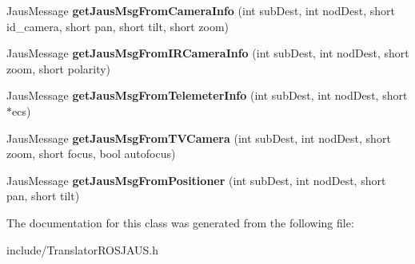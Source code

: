 \begin{DoxyCompactItemize}
\item 
\hypertarget{class_translator_r_o_s_j_a_u_s_a167106a825d6150694f072ceae6713d5}{\-Jaus\-Message {\bfseries get\-Jaus\-Msg\-From\-Camera\-Info} (int sub\-Dest, int nod\-Dest, short id\-\_\-camera, short pan, short tilt, short zoom)}\label{class_translator_r_o_s_j_a_u_s_a167106a825d6150694f072ceae6713d5}

\item 
\hypertarget{class_translator_r_o_s_j_a_u_s_aa5b8fd82be3d47ec039d7152cbe9ed62}{\-Jaus\-Message {\bfseries get\-Jaus\-Msg\-From\-I\-R\-Camera\-Info} (int sub\-Dest, int nod\-Dest, short zoom, short polarity)}\label{class_translator_r_o_s_j_a_u_s_aa5b8fd82be3d47ec039d7152cbe9ed62}

\item 
\hypertarget{class_translator_r_o_s_j_a_u_s_ad2fef431c697d2f4571d019e3d48c6f3}{\-Jaus\-Message {\bfseries get\-Jaus\-Msg\-From\-Telemeter\-Info} (int sub\-Dest, int nod\-Dest, short $\ast$ecs)}\label{class_translator_r_o_s_j_a_u_s_ad2fef431c697d2f4571d019e3d48c6f3}

\item 
\hypertarget{class_translator_r_o_s_j_a_u_s_ad41154d4df9127fff126923330e3cad8}{\-Jaus\-Message {\bfseries get\-Jaus\-Msg\-From\-T\-V\-Camera} (int sub\-Dest, int nod\-Dest, short zoom, short focus, bool autofocus)}\label{class_translator_r_o_s_j_a_u_s_ad41154d4df9127fff126923330e3cad8}

\item 
\hypertarget{class_translator_r_o_s_j_a_u_s_ada66a5e21bf4daacf3677d4a76cb4f2b}{\-Jaus\-Message {\bfseries get\-Jaus\-Msg\-From\-Positioner} (int sub\-Dest, int nod\-Dest, short pan, short tilt)}\label{class_translator_r_o_s_j_a_u_s_ada66a5e21bf4daacf3677d4a76cb4f2b}

\end{DoxyCompactItemize}


\-The documentation for this class was generated from the following file\-:\begin{DoxyCompactItemize}
\item 
include/\-Translator\-R\-O\-S\-J\-A\-U\-S.\-h\end{DoxyCompactItemize}

